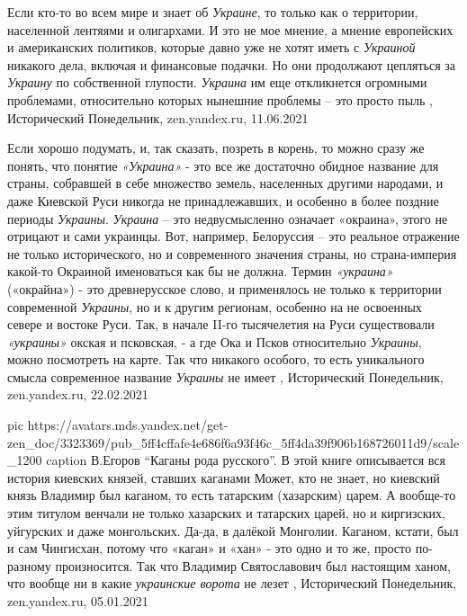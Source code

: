Если кто-то во всем мире и знает об \emph{Украине}, то только как о территории,
населенной лентяями и олигархами. И это не мое мнение, а мнение европейских и
американских политиков, которые давно уже не хотят иметь с \emph{Украиной} никакого
дела, включая и финансовые подачки. Но они продолжают цепляться за \emph{Украину} по
собственной глупости. \emph{Украина} им еще откликнется огромными проблемами,
относительно которых нынешние проблемы – это просто пыль
, 
Исторический Понедельник, zen.yandex.ru, 11.06.2021

Если хорошо подумать, и, так сказать, позреть в корень, то можно сразу же
понять, что понятие \emph{«Украина»} - это все же достаточно обидное название для
страны, собравшей в себе множество земель, населенных другими народами, и даже
Киевской Руси никогда не принадлежавших, и особенно в более поздние периоды
\emph{Украины}. \emph{Украина} – это недвусмысленно означает «окраина», этого не отрицают и
сами украинцы. Вот, например, Белоруссия – это реальное отражение не только
исторического, но и современного значения страны, но страна-империя какой-то
Окраиной именоваться как бы не должна.  Термин \emph{«украина»} («окрайна») - это
древнерусское слово, и применялось не только к территории современной \emph{Украины},
но и к другим регионам, особенно на не освоенных севере и востоке Руси. Так, в
начале II-го тысячелетия на Руси существовали \emph{«украины»} окская и псковская, - а
где Ока и Псков относительно \emph{Украины}, можно посмотреть на карте. Так что
никакого особого, то есть уникального смысла современное название \emph{Украины} не
имеет
, Исторический Понедельник, zen.yandex.ru, 22.02.2021

\ifcmt
  pic https://avatars.mds.yandex.net/get-zen_doc/3323369/pub_5ff4cffafe4e686f6a93f46c_5ff4da39f906b168726011d9/scale_1200
	caption В.Егоров \enquote{Каганы рода русского}. В этой книге описывается вся история киевских князей, ставших каганами
\fi
Может, кто не знает, но киевский князь Владимир был каганом, то есть татарским
(хазарским) царем. А вообще-то этим титулом венчали не только хазарских и
татарских царей, но и киргизских, уйгурских и даже монгольских. Да-да, в
далёкой Монголии. Каганом, кстати, был и сам Чингисхан, потому что «каган» и
«хан» - это одно и то же, просто по-разному произносится. Так что Владимир
Святославович был настоящим ханом, что вообще ни в какие \emph{украинские ворота} не
лезет
,
Исторический Понедельник, zen.yandex.ru, 05.01.2021 

